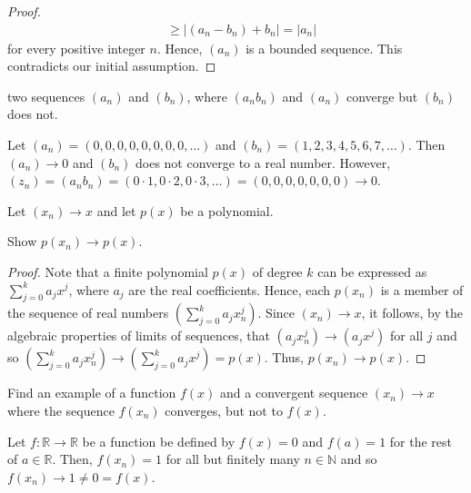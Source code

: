 \documentclass[12pt]{article}
\newcommand{\N}{\mathbb{N}}
\newcommand{\R}{\mathbb{R}}
\newenvironment{problem}[2][Problem]{\begin{trivlist} \item[\hskip \labelsep {\bfseries #1}\hskip \labelsep {\bfseries #2.}]}{\end{trivlist}}
\newenvironment{solution}[1][Solution]{\begin{trivlist} \item[\hskip \labelsep {\bfseries #1}]}{\end{trivlist}}
\begin{document}
\begin{problem}{2.3.7}
\begin{enumerate}
\begin{proof}
\begin{align*}
      &\geq |(a_{n}-b_{n})+b_{n}| = |a_{n}|
    \end{align*}
    for every positive integer $n$. Hence, $(a_{n})$ is a bounded sequence. This contradicts our initial assumption.
    \end{proof}
      \item two sequences $(a_{n})$ and $(b_{n})$, where $(a_{n}b_{n})$ and $(a_{n})$ converge but $(b_{n})$ does not.
    \begin{solution}
      Let $(a_{n}) = (0,0,0,0,0,0,0,0,\dots)$ and $(b_{n}) = (1,2,3,4,5,6,7,\dots)$. Then $(a_{n})\to 0$ and $(b_{n})$ does not converge to a real number. However, $(z_{n}) = (a_{n}b_{n}) = (0\cdot 1, 0\cdot 2, 0\cdot 3, \dots) = (0,0,0,0,0,0,0) \to 0$.
    \end{solution}
    \end{enumerate}
    \end{problem}
    \begin{problem}{2.3.8}
      Let $(x_{n})\to x$ and let $p(x)$ be a polynomial.
    \begin{enumerate}
      \item Show $p(x_{n}) \to p(x)$.
    \begin{proof}
      Note that a finite polynomial $p(x)$ of degree $k$ can be expressed as $\sum_{j=0}^{k} a_{j}x^{j}$, where $a_{j}$ are the real coefficients. Hence, each $p(x_{n})$ is a member of the sequence of real numbers $ \left( \sum_{j=0}^{k} a_{j}x_{n}^{j} \right)$. Since $(x_{n})\to x$, it follows, by the algebraic properties of limits of sequences, that $(a_{j}x_{n}^{j}) \to (a_{j}x^{j})$ for all $j$ and so $\left( \sum_{j=0}^{k} a_{j}x_{n}^{j} \right)\to \left( \sum_{j=0}^{k} a_{j}x^{j} \right) = p(x)$. Thus, $p(x_{n}) \to p(x)$.
    \end{proof}
      \item Find an example of a function $f(x)$ and a convergent sequence $(x_{n}) \to x$ where the sequence $f(x_{n})$ converges, but not to $f(x)$.
    \begin{solution}
      Let $f:\R\to \R$ be a function be defined by $f(x) = 0$ and $f(a)=1$ for the rest of $a\in \R$. Then, $f(x_{n})=1$ for all but finitely many $n\in \N$ and so $f(x_{n}) \to 1 \neq 0 = f(x)$.
    \end{solution}
    \end{enumerate}
    \end{problem}
\end{document}
